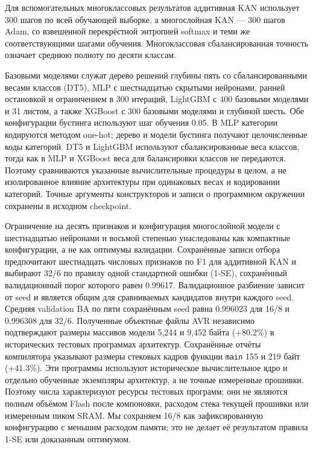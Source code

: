 Для вспомогательных многоклассовых результатов аддитивная KAN использует 300 шагов по всей обучающей выборке, а многослойная KAN --- 300 шагов Adam, со взвешенной перекрёстной энтропией softmax и теми же соответствующими шагами обучения. Многоклассовая сбалансированная точность означает среднюю полноту по десяти классам.

Базовыми моделями служат дерево решений глубины пять со сбалансированными весами классов (DT5), MLP с шестнадцатью скрытыми нейронами, ранней остановкой и ограничением в 300 итераций, LightGBM с 400 базовыми моделями и 31 листом, а также XGBoost с 300 базовыми моделями и глубиной шесть. Обе конфигурации бустинга используют шаг обучения 0.05. В MLP категории кодируются методом one-hot; дерево и модели бустинга получают целочисленные коды категорий. DT5 и LightGBM используют сбалансированные веса классов, тогда как в MLP и XGBoost веса для балансировки классов не передаются. Поэтому сравниваются указанные вычислительные процедуры в целом, а не изолированное влияние архитектуры при одинаковых весах и кодировании категорий. Точные аргументы конструкторов и записи о программном окружении сохранены в исходном checkpoint.

Ограничение на десять признаков и конфигурация многослойной модели с шестнадцатью нейронами и восьмой степенью унаследованы как компактные конфигурации, а не как оптимумы валидации. Сохранённые записи отбора предпочитают шестнадцать числовых признаков по F1 для аддитивной KAN и выбирают 32/6 по правилу одной стандартной ошибки (1-SE), сохранённый валидационный порог которого равен 0.99617. Валидационное разбиение зависит от seed и является общим для сравниваемых кандидатов внутри каждого seed. Средняя validation BA по пяти сохранённым seed равна 0.996023 для 16/8 и 0.996308 для 32/6. Полученные объектные файлы AVR независимо подтверждают размеры массивов модели 5,244 и 9,452 байта (+80.2\%) в исторических тестовых программах архитектур. Сохранённые отчёты компилятора указывают размеры стековых кадров функции \texttt{main} 155 и 219 байт (+41.3\%). Эти программы используют историческое вычислительное ядро и отдельно обученные экземпляры архитектур, а не точные измеренные прошивки. Поэтому числа характеризуют ресурсы тестовых программ; они не являются полным объёмом Flash после компоновки, расходом стека текущей прошивки или измеренным пиком SRAM. Мы сохраняем 16/8 как зафиксированную конфигурацию с меньшим расходом памяти; это не делает её результатом правила 1-SE или доказанным оптимумом.

